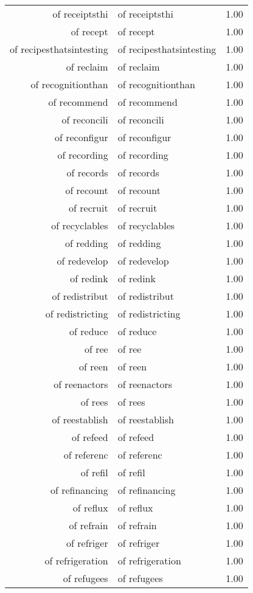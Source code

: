 \begin{table}[ht]
\begin{tabular}{rlr}
  of receiptsthi & of receiptsthi & 1.00 \\ 
  of recept & of recept & 1.00 \\ 
  of recipesthatsintesting & of recipesthatsintesting & 1.00 \\ 
  of reclaim & of reclaim & 1.00 \\ 
  of recognitionthan & of recognitionthan & 1.00 \\ 
  of recommend & of recommend & 1.00 \\ 
  of reconcili & of reconcili & 1.00 \\ 
  of reconfigur & of reconfigur & 1.00 \\ 
  of recording & of recording & 1.00 \\ 
  of records & of records & 1.00 \\ 
  of recount & of recount & 1.00 \\ 
  of recruit & of recruit & 1.00 \\ 
  of recyclables & of recyclables & 1.00 \\ 
  of redding & of redding & 1.00 \\ 
  of redevelop & of redevelop & 1.00 \\ 
  of redink & of redink & 1.00 \\ 
  of redistribut & of redistribut & 1.00 \\ 
  of redistricting & of redistricting & 1.00 \\ 
  of reduce & of reduce & 1.00 \\ 
  of ree & of ree & 1.00 \\ 
  of reen & of reen & 1.00 \\ 
  of reenactors & of reenactors & 1.00 \\ 
  of rees & of rees & 1.00 \\ 
  of reestablish & of reestablish & 1.00 \\ 
  of refeed & of refeed & 1.00 \\ 
  of referenc & of referenc & 1.00 \\ 
  of refil & of refil & 1.00 \\ 
  of refinancing & of refinancing & 1.00 \\ 
  of reflux & of reflux & 1.00 \\ 
  of refrain & of refrain & 1.00 \\ 
  of refriger & of refriger & 1.00 \\ 
  of refrigeration & of refrigeration & 1.00 \\ 
  of refugees & of refugees & 1.00 \\ 

\end{tabular}
\end{table}
